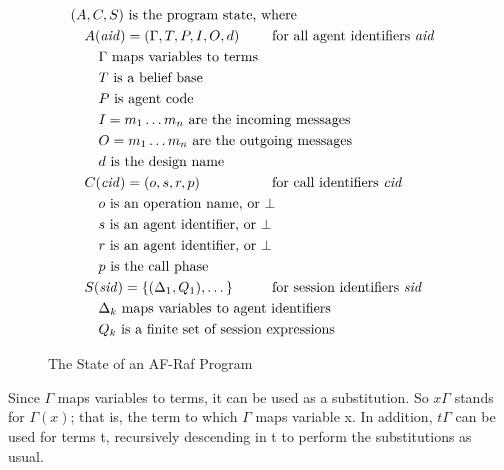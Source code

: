 \documentclass[a4paper,12pt,oneside,fleqn]{book} %
\begin{document}
{\begin{figure}
\def\.#1{\text{\rlap{ #1}}}
\begin{align*}
&(A, C, S)\.{is the program state, where} \\
&\quad A({\it aid})=(\Gamma, T, P, I, O, d)
  &&\text{for all agent identifiers~$\it aid$} \\
&\quad\quad \text{$\Gamma$ maps variables to terms} \\
&\quad\quad T\.{is a belief base} \\
&\quad\quad P\.{is agent code} \\
&\quad\quad I=m_1\ldots m_n\.{are the incoming messages} \\
&\quad\quad O=m_1\ldots m_n\.{are the outgoing messages} \\
&\quad\quad d\.{is the design name} \\
&\quad C({\it cid})=(o,s,r,p)
  &&\text{for call identifiers~$\it cid$} \\
&\quad\quad o\.{is an operation name, or $\bot$} \\
&\quad\quad s\.{is an agent identifier, or $\bot$} \\
&\quad\quad r\.{is an agent identifier, or $\bot$} \\
&\quad\quad p\.{is the call phase} \\
&\quad S({\it sid})=\{(\Delta_1,Q_1),\ldots\,\}
  &&\text{for session identifiers~$\it sid$} \\
&\quad\quad \Delta_k\.{maps variables to agent identifiers} \\
&\quad\quad Q_k\.{is a finite set of session expressions}
\end{align*}
\caption{The State of an AF-Raf Program}
\label{fig:af-raf-state}
\end{figure}

\begin{remark}
  Since $\Gamma$ maps variables to terms, it can be used as a substitution.
  So $x\Gamma$ stands for $\Gamma(x)$; that is, the term to which $\Gamma$
  maps variable x. In addition, $t\Gamma$ can be used for terms t,
  recursively descending in t to perform the substitutions as usual.
  \label{r:subst}
\end{remark}

}
\end{document}
